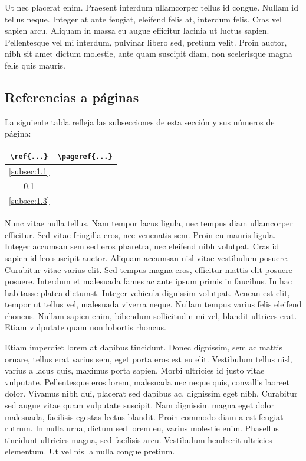 \documentclass[a4paper,10pt]{article}
\theoremstyle{teorema}
\theoremstyle{plano}
\theoremstyle{titulo}
\begin{document}
Ut nec placerat enim. Praesent interdum ullamcorper tellus id congue. Nullam id tellus neque. Integer at ante feugiat, eleifend felis at, interdum felis. Cras vel sapien arcu. Aliquam in massa eu augue efficitur lacinia ut luctus sapien. Pellentesque vel mi interdum, pulvinar libero sed, pretium velit. Proin auctor, nibh sit amet dictum molestie, ante quam suscipit diam, non scelerisque magna felis quis mauris.

\subsection{Referencias a páginas}\label{subsec:1.2}

La siguiente tabla refleja las subsecciones de esta sección y sus números de página:

\begin{table}[h]
    \centering
    \begin{tabular}{cc}
\verb|\ref{...}| & \verb|\pageref{...}| \\ \hline
       \ref{subsec:1.1}          &        \pageref{subsec:1.1}              \\
      \ref{subsec:1.2}           &    \pageref{subsec:1.2}                  \\
      \ref{subsec:1.3}           &   \pageref{subsec:1.3}        
\end{tabular}
\end{table}

Nunc vitae nulla tellus. Nam tempor lacus ligula, nec tempus diam ullamcorper efficitur. Sed vitae fringilla eros, nec venenatis sem. Proin eu mauris ligula. Integer accumsan sem sed eros pharetra, nec eleifend nibh volutpat. Cras id sapien id leo suscipit auctor. Aliquam accumsan nisl vitae vestibulum posuere. Curabitur vitae varius elit. Sed tempus magna eros, efficitur mattis elit posuere posuere. Interdum et malesuada fames ac ante ipsum primis in faucibus. In hac habitasse platea dictumst. Integer vehicula dignissim volutpat. Aenean est elit, tempor ut tellus vel, malesuada viverra neque. Nullam tempus varius felis eleifend rhoncus. Nullam sapien enim, bibendum sollicitudin mi vel, blandit ultrices erat. Etiam vulputate quam non lobortis rhoncus.

Etiam imperdiet lorem at dapibus tincidunt. Donec dignissim, sem ac mattis ornare, tellus erat varius sem, eget porta eros est eu elit. Vestibulum tellus nisl, varius a lacus quis, maximus porta sapien. Morbi ultricies id justo vitae vulputate. Pellentesque eros lorem, malesuada nec neque quis, convallis laoreet dolor. Vivamus nibh dui, placerat sed dapibus ac, dignissim eget nibh. Curabitur sed augue vitae quam vulputate suscipit. Nam dignissim magna eget dolor malesuada, facilisis egestas lectus blandit. Proin commodo diam a est feugiat rutrum. In nulla urna, dictum sed lorem eu, varius molestie enim. Phasellus tincidunt ultricies magna, sed facilisis arcu. Vestibulum hendrerit ultricies elementum. Ut vel nisl a nulla congue pretium.
\end{document}
